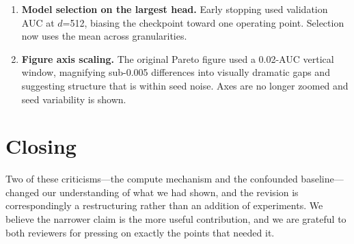 \documentclass[11pt,a4paper]{article}
\begin{document}
\begin{enumerate}[leftmargin=*,itemsep=4pt]
\item \textbf{Model selection on the largest head.} Early stopping used
validation AUC at $d$=512, biasing the checkpoint toward one operating point.
Selection now uses the mean across granularities.

\item \textbf{Figure axis scaling.} The original Pareto figure used a
0.02-AUC vertical window, magnifying sub-0.005 differences into visually
dramatic gaps and suggesting structure that is within seed noise. Axes are no
longer zoomed and seed variability is shown.
\end{enumerate}

\section*{Closing}

Two of these criticisms---the compute mechanism and the confounded
baseline---changed our understanding of what we had shown, and the revision is
correspondingly a restructuring rather than an addition of experiments. We
believe the narrower claim is the more useful contribution, and we are
grateful to both reviewers for pressing on exactly the points that needed it.
\end{document}
